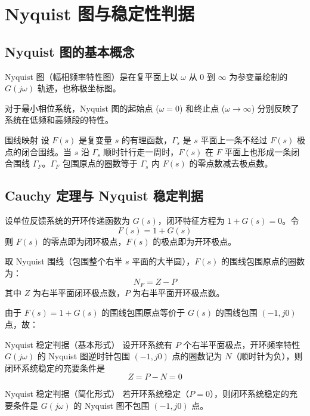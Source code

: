 \section{Nyquist 图与稳定性判据}

\subsection{Nyquist 图的基本概念}

Nyquist 图（幅相频率特性图）是在复平面上以 $\omega$ 从 $0$ 到 $\infty$ 为参变量绘制的 $G(j\omega)$ 轨迹，也称极坐标图。

对于最小相位系统，Nyquist 图的起始点 ($\omega=0$) 和终止点 ($\omega\to\infty$) 分别反映了系统在低频和高频段的特性。

\begin{mydefinition}{围线映射}
设 $F(s)$ 是复变量 $s$ 的有理函数，$\Gamma_s$ 是 $s$ 平面上一条不经过 $F(s)$ 极点的闭合围线。当 $s$ 沿 $\Gamma_s$ 顺时针行走一周时，$F(s)$ 在 $F$ 平面上也形成一条闭合围线 $\Gamma_F$。$\Gamma_F$ 包围原点的圈数等于 $\Gamma_s$ 内 $F(s)$ 的零点数减去极点数。
\end{mydefinition}

\subsection{Cauchy 定理与 Nyquist 稳定判据}

设单位反馈系统的开环传递函数为 $G(s)$，闭环特征方程为 $1 + G(s) = 0$。令
\[
F(s) = 1 + G(s)
\]
则 $F(s)$ 的零点即为闭环极点，$F(s)$ 的极点即为开环极点。

取 Nyquist 围线（包围整个右半 $s$ 平面的大半圆），$F(s)$ 的围线包围原点的圈数为：
\[
N_F = Z - P
\]
其中 $Z$ 为右半平面闭环极点数，$P$ 为右半平面开环极点数。

由于 $F(s) = 1 + G(s)$ 的围线包围原点等价于 $G(s)$ 的围线包围 $(-1, j0)$ 点，故：

\begin{myTheorem}{Nyquist 稳定判据（基本形式）}
设开环系统有 $P$ 个右半平面极点，开环频率特性 $G(j\omega)$ 的 Nyquist 图逆时针包围 $(-1, j0)$ 点的圈数记为 $N$（顺时针为负），则闭环系统稳定的充要条件是
\[
Z = P - N = 0
\]
\end{myTheorem}

\begin{myTheorem}{Nyquist 稳定判据（简化形式）}
若开环系统稳定（$P = 0$），则闭环系统稳定的充要条件是 $G(j\omega)$ 的 Nyquist 图不包围 $(-1, j0)$ 点。
\end{myTheorem}


